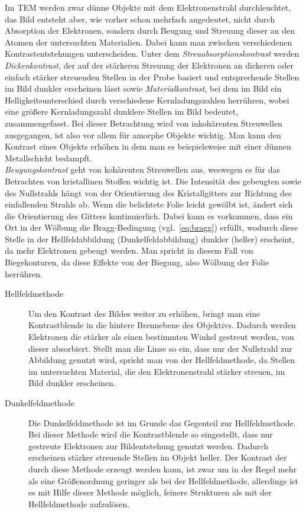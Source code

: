 \documentclass[slug=TEM, room=IFW, supervisor=?, coursedate=23.\ 01.\ 2020]{../../Lab_Report_LaTeX/lab_report}
\begin{document}
Im TEM werden zwar dünne Objekte mit dem Elektronenstrahl durchleuchtet, das Bild entsteht aber,
wie vorher schon mehrfach angedeutet, nicht durch Absorption der Elektronen, sondern durch
Beugung und Streuung dieser an den Atomen der untersuchten Materialien.
Dabei kann man zwischen verschiedenen Kontrastentstehungen unterscheiden. Unter dem
\emph{Streuabsorptionskontrast} werden \emph{Dickenkontrast}, der auf der stärkeren Streuung der
Elektronen an dickeren oder einfach stärker streuenden Stellen in der Probe basiert und
entsprechende Stellen im Bild dunkler erscheinen lässt sowie
\emph{Materialkontrast}, bei dem im Bild ein Helligkeitsunterschied durch verschiedene
Kernladungszahlen herrühren, wobei eine größere Kernladungszahl dunklere Stellen im Bild bedeutet,
zusammengefasst.
Bei dieser Betrachtung wird von inkohärenten Streuwellen ausgegangen, ist also vor allem für
amorphe Objekte wichtig.
Man kann den Kontrast eines Objekts erhöhen in dem man es beispielsweise mit einer dünnen 
Metallschicht bedampft.\\
\emph{Beugungskontrast} geht von kohärenten Streuwellen aus, weswegen es für das Betrachten
von kristallinen Stoffen wichtig ist. Die Intensität des gebeugten sowie des Nullstrahls hängt
von der Orientierung des Kristallgitters zur Richtung des einfallenden Strahls ab. Wenn die 
belichtete Folie leicht gewölbt ist, ändert sich die Orientierung des Gitters kontinuierlich.
Dabei kann es vorkommen, dass ein Ort in der Wölbung die Bragg-Bedingung (vgl.~\ref{eq:bragg})
erfüllt, wodurch diese Stelle in der Hellfeldabbildung (Dunkelfeldabbildung) dunkler (heller) 
erscheint, da mehr Elektronen gebeugt werden. Man spricht in diesem Fall von Biegekonturen, da
diese Effekte von der Biegung, also Wölbung der Folie herrühren.

\begin{description}
	\item[Hellfeldmethode] Um den Kontrast des Bildes weiter zu erhöhen, bringt man eine Kontrastblende in die hintere
	Brennebene des Objektivs. Dadurch werden Elektronen die stärker als einen bestimmten Winkel
	gestreut werden, von dieser absorbiert. Stellt man die Linse so ein, dass nur der Nullstrahl zur
	Abbildung genutzt wird, spricht man von der Hellfeldmethode, da Stellen im untersuchten Material,
	die den Elektronenstrahl stärker streuen, im Bild dunkler erscheinen.
	\item[Dunkelfeldmethode] Die Dunkelfeldmethode ist im Grunde das Gegenteil zur Hellfeldmethode. Bei dieser Methode wird die
	Kontrastblende so eingestellt, dass nur gestreute Elektronen zur Bildentstehung genutzt werden.
	Dadurch erscheinen stärker streuende Stellen im Objekt heller. Der Kontrast der durch diese
	Methode erzeugt werden kann, ist zwar um in der Regel mehr als eine Größenordnung geringer
	als bei der Hellfeldmethode, allerdings ist es mit Hilfe dieser Methode möglich, feinere 
	Strukturen als mit der Hellfeldmethode aufzulösen.
\end{description}
\end{document}
